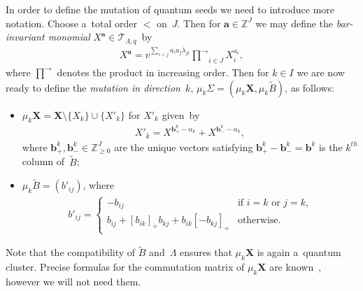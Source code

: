 \documentclass[pdftex]{sigma}
\numberwithin{equation}{section}
\begin{document}
In order to def\/ine the mutation of quantum seeds we need to introduce more notation.
Choose a~total order $<$ on~$J$.
Then for $\mathbf{a}\in\mathbb{Z}^J$ we may def\/ine the \emph{bar-invariant monomial} $X^\mathbf{a}\in\mathcal{T}_{\Lambda,q}$~by
\begin{gather*}
X^\mathbf{a}=v^{\sum\limits_{i<j}a_ia_j\lambda_{ji}}\vec \prod_{i\in J}X_i^{a_i},
\end{gather*}
where $\vec\prod$ denotes the product in increasing order.
Then for $k\in I$ we are now ready to def\/ine the \emph{mutation in direction~$k$},
$\mu_k\Sigma=(\mu_k\mathbf{X},\mu_k\widetilde B)$, as follows:
\begin{itemize}\itemsep=0pt
\item $\mu_k\mathbf{X}=\mathbf{X}\setminus\{X_k\}\cup\{X'_k\}$ for $X'_k$ given~by
\begin{gather*}
X'_k=X^{\mathbf{b}^k_+-\alpha_k}+X^{\mathbf{b}^k_--\alpha_k},
\end{gather*}
where $\mathbf{b}^k_+,\mathbf{b}^k_-\in\mathbb{Z}_{\ge0}^J$ are the unique vectors satisfying
$\mathbf{b}^k_+-\mathbf{b}^k_-=\mathbf{b}^k$ is the $k^{th}$ column of~$\widetilde B$;
\item $\mu_k\widetilde B=(b'_{ij})$, where
\begin{gather*}
b'_{ij}=
\begin{cases}
-b_{ij} & \text{if $i=k$ or $j=k$,}
\\
b_{ij}+[b_{ik}]_+b_{kj}+b_{ik}[-b_{kj}]_+ & \text{otherwise.}
\end{cases}
\end{gather*}
\end{itemize}
Note that the compatibility of $\tilde B$ and~$\Lambda$ ensures that $\mu_k\mathbf{X}$ is again a~quantum cluster.
Precise formulas for the commutation matrix of $\mu_k\mathbf{X}$ are known~\cite{berenstein-zelevinsky}, however we will
not need them.
\end{document}
